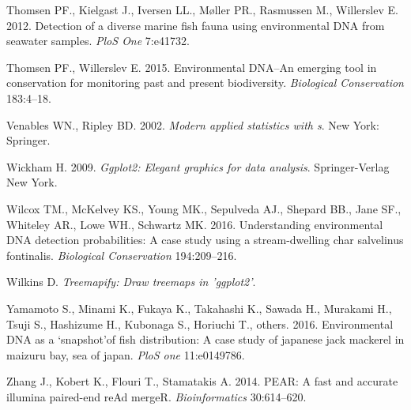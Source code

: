 \documentclass[fleqn,10pt,lineno]{wlpeerj} %
\begin{document}
\hypertarget{ref-thomsen_detection_2012}{}
Thomsen PF., Kielgast J., Iversen LL., Møller PR., Rasmussen M.,
Willerslev E. 2012. Detection of a diverse marine fish fauna using
environmental DNA from seawater samples. \emph{PloS One} 7:e41732.

\hypertarget{ref-thomsen2015environmental}{}
Thomsen PF., Willerslev E. 2015. Environmental DNA--An emerging tool in
conservation for monitoring past and present biodiversity.
\emph{Biological Conservation} 183:4--18.

\hypertarget{ref-MASS}{}
Venables WN., Ripley BD. 2002. \emph{Modern applied statistics with s}.
New York: Springer.

\hypertarget{ref-ggplot}{}
Wickham H. 2009. \emph{Ggplot2: Elegant graphics for data analysis}.
Springer-Verlag New York.

\hypertarget{ref-wilcox2016understanding}{}
Wilcox TM., McKelvey KS., Young MK., Sepulveda AJ., Shepard BB., Jane
SF., Whiteley AR., Lowe WH., Schwartz MK. 2016. Understanding
environmental DNA detection probabilities: A case study using a
stream-dwelling char salvelinus fontinalis. \emph{Biological
Conservation} 194:209--216.

\hypertarget{ref-treemapify}{}
Wilkins D. \emph{Treemapify: Draw treemaps in 'ggplot2'}.

\hypertarget{ref-yamamoto2016environmental}{}
Yamamoto S., Minami K., Fukaya K., Takahashi K., Sawada H., Murakami H.,
Tsuji S., Hashizume H., Kubonaga S., Horiuchi T., others. 2016.
Environmental DNA as a `snapshot'of fish distribution: A case study of
japanese jack mackerel in maizuru bay, sea of japan. \emph{PloS one}
11:e0149786.

\hypertarget{ref-zhang2014pear}{}
Zhang J., Kobert K., Flouri T., Stamatakis A. 2014. PEAR: A fast and
accurate illumina paired-end reAd mergeR. \emph{Bioinformatics}
30:614--620.
\end{document}
